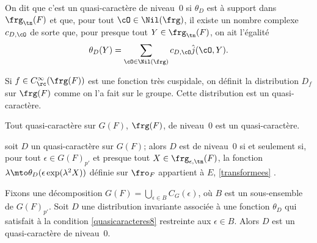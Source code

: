 On dit que c'est un quasi-caractère de niveau~$0$ si $\theta_{D}$ est à support dans $\frg_{\tn}(F)$ et que, pour tout $\cO\in \Nil(\frg)$, il existe un nombre complexe $c_{D,\cO}$ de sorte que, pour presque tout $Y\in \frg_{\tn}(F)$, on ait l'égalité
\[
\theta_{D}(Y)=\sum_{\cO\in \Nil(\frg)}c_{D,\cO}\hat{j}(\cO,Y).
\]

Si $f\in C_{\rc}^{\infty}(\frg(F))$ est une fonction très cuspidale, on définit la distribution $D_{f}$ sur $\frg(F)$ comme on l'a fait sur le groupe. Cette distribution est un quasi-caractère.

\skpt
\begin{lem*}
\begin{enumeratei}
\item\label{quasicaracteresi}
Tout quasi-caractère sur $G(F)$, \resp $\frg(F)$, de niveau~$0$ est un quasi-caractère.

\item\label{quasicaracteresii}
soit $D$ un quasi-caractère sur $G(F)$; alors $D$ est de niveau~$0$ si et seulement si, pour tout $\epsilon\in G(F)_{p'}$ et presque tout $X\in \frg_{\epsilon,\tn}(F)$, la fonction $\lambda\mto \theta_{D}(\epsilon \exp(\lambda^2X))$ définie sur $\fro_{F}$ appartient à $E$, \cf \ref{transformees} .

\item\label{quasicaracteresiii}
Fixons une décomposition $G(F)=\bigcup_{\epsilon\in B}C_{G}(\epsilon)$, où $B$ est un sous-ensemble de $G(F)_{p'}$. Soit $D$ une distribution invariante associée à une fonction $\theta_{D}$ qui satisfait à la condition \eqref{quasicaracteres8} restreinte aux $\epsilon\in B$. Alors $D$ est un quasi-caractère de niveau~$0$.
\end{enumeratei}
\end{lem*}

